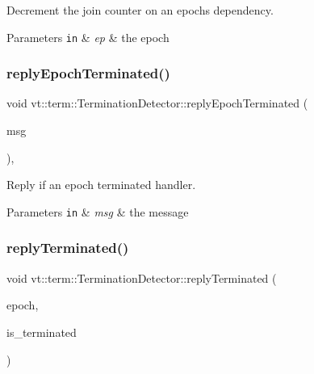 Decrement the join counter on an epoch\textquotesingle{}s dependency. 


\begin{DoxyParams}[1]{Parameters}
\mbox{\tt in}  & {\em ep} & the epoch \\
\hline
\end{DoxyParams}
\mbox{\label{structvt_1_1term_1_1_termination_detector_ad4e25e7f6a8703bdff30bc2f56ab195f}} 
\subsubsection{\texorpdfstring{reply\+Epoch\+Terminated()}{replyEpochTerminated()}}
{\footnotesize\ttfamily void vt\+::term\+::\+Termination\+Detector\+::reply\+Epoch\+Terminated (\begin{DoxyParamCaption}\item[{\hyperlink{structvt_1_1term_1_1_term_terminated_reply_msg}{Term\+Terminated\+Reply\+Msg} $\ast$}]{msg }\end{DoxyParamCaption})\hspace{0.3cm}{\ttfamily [static]}, {\ttfamily [private]}}



Reply if an epoch terminated handler. 


\begin{DoxyParams}[1]{Parameters}
\mbox{\tt in}  & {\em msg} & the message \\
\hline
\end{DoxyParams}
\mbox{\label{structvt_1_1term_1_1_termination_detector_a4ea359dfd9c7cbd1c8dc96f5dff78ed1}} 
\subsubsection{\texorpdfstring{reply\+Terminated()}{replyTerminated()}}
{\footnotesize\ttfamily void vt\+::term\+::\+Termination\+Detector\+::reply\+Terminated (\begin{DoxyParamCaption}\item[{\hyperlink{namespacevt_a985a5adf291c34a3ca263b3378388236}{Epoch\+Type} const \&}]{epoch,  }\item[{bool const \&}]{is\+\_\+terminated }\end{DoxyParamCaption})\hspace{0.3cm}{\ttfamily [private]}}



